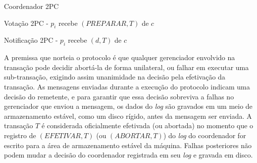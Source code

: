 \documentclass[11pt,twoside,a4paper]{book}
\begin{document}
\begin{algorithm}
\caption{Coordenador 2PC}
\label{alg:2pc_coordenador}
\end{algorithm}

\begin{algorithm}
\caption{Votação 2PC - $p_i$ recebe $(PREPARAR, T)$ de $c$}
\label{alg:2pc_participante1}
\end{algorithm}

\begin{algorithm}
\caption{Notificação 2PC - $p_i$ recebe $(d, T)$ de $c$}
\label{alg:2pc_participante2}
\end{algorithm}

A premissa que norteia o protocolo é que qualquer gerenciador envolvido na
transação pode decidir abortá-la de forma unilateral, ou falhar em executar uma
sub-transação, exigindo assim unanimidade na decisão pela efetivação da
transação.
As mensagens enviadas durante a execução do protocolo indicam uma decisão do remetente, e para garantir que essa decisão sobreviva a falhas no 
gerenciador que enviou a mensagem, os dados do \emph{log} são gravados em um meio de armazenamento estável, como um disco rígido, antes da 
mensagem ser enviada. A transação $T$ é considerada oficialmente efetivada (ou abortada) no momento que o registro de $(EFETIVAR, T)$ 
(ou $(ABORTAR, T)$) do \emph{log} do coordenador for escrito para a área de armazenamento estável da máquina. Falhas posteriores não podem mudar 
a decisão do coordenador registrada em seu \emph{log} e gravada em disco.
\end{document}
